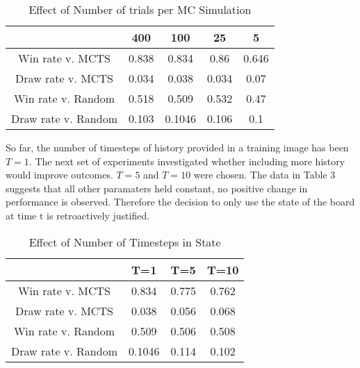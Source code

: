 \documentclass[twoside,11pt]{article}
\begin{document}
\begin{table}[ht]
    \caption{Effect of Number of trials per MC Simulation}
\begin{center}
    \begin{tabular}{||c c c c c||} 
    \hline
     & 400 & 100 & 25 & 5 \\ [0.5ex] 
    \hline\hline
    Win rate v. MCTS & 0.838 & 0.834 & 0.86 & 0.646\\ 
    \hline
    Draw rate v. MCTS & 0.034 & 0.038 & 0.034 & 0.07\\
    \hline
    Win rate v. Random &  0.518 & 0.509 & 0.532 &0.47\\
    \hline
    Draw rate v. Random & 0.103 & 0.1046 & 0.106 &0.1\\
    \hline
   \end{tabular}
   \end{center}
\end{table}


So far, the number of timesteps of history provided in a training image has been $T=1$. 
The next set of experiments investigated whether including more history would improve
outcomes. $T=5$ and $T=10$ were chosen. The data in Table 3 suggests that all other paramaters held
constant, no positive change in performance is observed. Therefore the decision to only use
the state of the board at time t is retroactively justified.

\begin{table}[ht]
    \caption{Effect of Number of Timesteps in State}
\begin{center}
    \begin{tabular}{||c c c c||} 
    \hline
     & T=1 & T=5 & T=10 \\ [0.5ex] 
    \hline\hline
    Win rate v. MCTS & 0.834  & 0.775 & 0.762 \\ 
    \hline
    Draw rate v. MCTS &  0.038  & 0.056 & 0.068 \\
    \hline
    Win rate v. Random &  0.509 & 0.506 & 0.508\\
    \hline
    Draw rate v. Random & 0.1046 & 0.114 & 0.102 \\
    \hline
   \end{tabular}
   \end{center}
\end{table}
\end{document}
